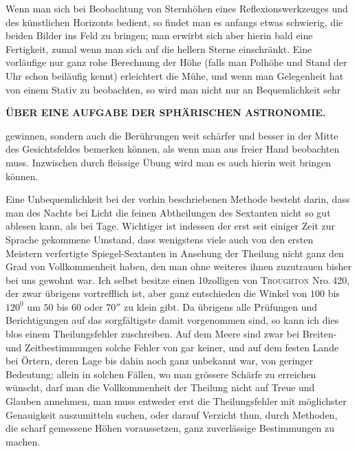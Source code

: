 Wenn man sich bei Beobachtung von Sternhöhen eines Reflexions\-werkzeuges
und des künstlichen Horizonts bedient, so findet man es anfangs etwas schwierig,
die beiden Bilder ins Feld zu bringen; man erwirbt sich aber hierin bald
eine Fertigkeit, zumal wenn man sich auf die hellern Sterne einschränkt. Eine
vorläufige nur ganz rohe Berechnung der Höhe (falls man Polhöhe und Stand der
Uhr schon beiläufig kennt) erleichtert die Mühe, und wenn man Gelegenheit hat
von einem Stativ zu beobachten, so wird man nicht nur an Bequemlichkeit sehr
\par\clearpage
\thispagestyle{empty}
\noindent{}%
\makebox[12mm][l]{}%
\parbox[t]{\dimexpr\linewidth-24mm\relax}{\centering\fontsize{8.5}{10}\selectfont\bfseries ÜBER EINE AUFGABE DER SPHÄRISCHEN ASTRONOMIE.\par}%
\par\nobreak\medskip
\noindent gewinnen, sondern auch die Berührungen weit schärfer und besser in der Mitte
des Gesichtsfeldes bemerken können, als wenn man aus freier Hand beobachten
muss. Inzwischen durch fleissige Übung wird man es auch hierin weit bringen
können.

Eine Unbequemlichkeit bei der vorhin beschriebenen Methode besteht darin,
dass man des Nachts bei Licht die feinen Abtheilungen des Sextanten nicht so
gut ablesen kann, als bei Tage. Wichtiger ist indessen der erst seit einiger Zeit
zur Sprache gekommene Umstand, dass wenigstens viele auch von den ersten
Meistern verfertigte Spiegel-Sextanten in Ansehung der Theilung nicht ganz den
Grad von Vollkommenheit haben, den man ohne weiteres ihnen zuzutrauen bisher
bei uns gewohnt war. Ich selbst besitze einen 10zolligen von \textsc{Troughton}
Nro.\,420, der zwar übrigens vortrefflich ist, aber ganz entschieden die Winkel
von $100$ bis $120^0$ um $50$ bis $60$ oder $70''$ zu klein gibt. Da übrigens alle Prüfungen
und Berichtigungen auf das sorgfältigste damit vorgenommen sind, so
kann ich dies blos einem Theilungsfehler zuschreiben. Auf dem Meere sind
zwar bei Breiten- und Zeitbestimmungen solche Fehler von gar keiner, und auf
dem festen Lande bei Örtern, deren Lage bis dahin noch ganz unbekannt war,
von geringer Bedeutung; allein in solchen Fällen, wo man grössere Schärfe zu
erreichen wünscht, darf man die Vollkommenheit der Theilung nicht auf Treue
und Glauben annehmen, man muss entweder erst die Theilungsfehler mit möglichster
Genauigkeit auszumitteln suchen, oder darauf Verzicht thun, durch Methoden,
die scharf gemessene Höhen voraussetzen, ganz zuverlässige Bestimmungen
zu machen.

